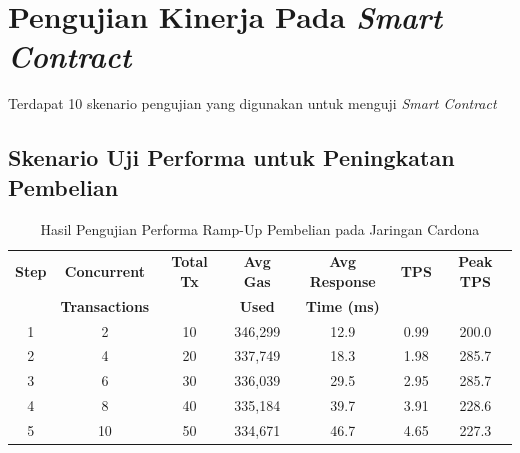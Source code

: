 \section{Pengujian Kinerja Pada \emph{Smart Contract}}
Terdapat 10 skenario pengujian yang digunakan untuk menguji \emph{Smart Contract}

\subsection{Skenario Uji Performa untuk Peningkatan Pembelian}
\begin{table}[h!]
  \centering
  \begin{tabular}{|c|c|c|c|c|c|c|}
    \hline
    \textbf{Step} & \textbf{Concurrent}   & \textbf{Total Tx} & \textbf{Avg Gas} & \textbf{Avg Response} & \textbf{TPS} & \textbf{Peak TPS} \\
    \textbf{}     & \textbf{Transactions} & \textbf{}         & \textbf{Used}    & \textbf{Time (ms)}    & \textbf{}    & \textbf{}         \\
    \hline
    1             & 2                     & 10                & 346,299          & 12.9                  & 0.99         & 200.0             \\
    \hline
    2             & 4                     & 20                & 337,749          & 18.3                  & 1.98         & 285.7             \\
    \hline
    3             & 6                     & 30                & 336,039          & 29.5                  & 2.95         & 285.7             \\
    \hline
    4             & 8                     & 40                & 335,184          & 39.7                  & 3.91         & 228.6             \\
    \hline
    5             & 10                    & 50                & 334,671          & 46.7                  & 4.65         & 227.3             \\
    \hline
  \end{tabular}
  \caption{Hasil Pengujian Performa Ramp-Up Pembelian pada Jaringan Cardona}
  \label{tab:cardona_performance}
\end{table}

